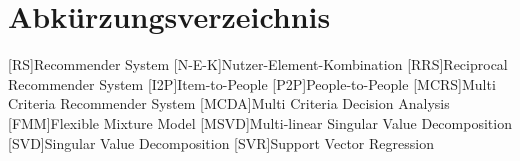 \renewcommand{\chaptermark}[1]{\markboth{\spacedlowsmallcaps{#1}}{\spacedlowsmallcaps{#1}}}
\renewcommand{\sectionmark}[1]{\markright{\thesection\enspace\spacedlowsmallcaps{#1}}}
\chapter*{Abk\"{u}rzungsverzeichnis}

\begin{acronym}[AWGN]%
  [RS]{Recommender System}
  [N-E-K]{Nutzer-Element-Kombination}
  [RRS]{Reciprocal Recommender System}
  [I2P]{Item-to-People}
  [P2P]{People-to-People}
  [MCRS]{Multi Criteria Recommender System}
  [MCDA]{Multi Criteria Decision Analysis}
  [FMM]{Flexible Mixture Model}
  [MSVD]{Multi-linear Singular Value Decomposition}
  [SVD]{Singular Value Decomposition}
  [SVR]{Support Vector Regression}
\end{acronym}

\cleardoublepage
